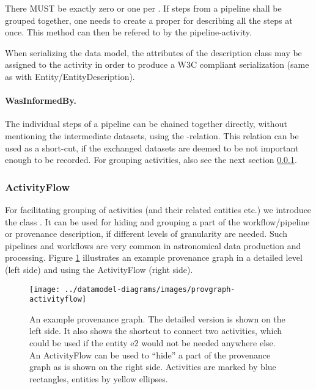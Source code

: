 There MUST be exactly zero or one  per . If steps from a 
pipeline shall be grouped together, one needs to create a proper 
 for describing all the steps at once. This method can then 
be refered to by the pipeline-activity. 

When serializing the data model, the attributes
of the description class may be assigned to the activity in order to produce 
a W3C compliant serialization (same as with Entity/EntityDescription).


\paragraph{WasInformedBy.}
The individual steps of a pipeline can be chained
together directly, without mentioning the intermediate datasets, using the -relation.
This relation can be used as a short-cut, if the exchanged datasets are deemed to be not important
enough to be recorded. For grouping activities, also see the 
next section \ref{sec:activityflow}.


\subsubsection{ActivityFlow}\label{sec:activityflow}
For facilitating grouping of activities (and their related entities etc.)
we introduce the class .
It can be used for hiding and grouping a part of the workflow/pipeline 
or provenance 
description, if different levels of granularity are needed. Such pipelines and workflows are very common in astronomical data production and processing. Figure \ref{fig:provgraph-activityflow}
illustrates an example provenance graph in a detailed level (left side) 
and using the ActivityFlow (right side).


\begin{figure}[h]
\centering
\texttt{[image: ../datamodel-diagrams/images/provgraph-activityflow]}
\caption{An example provenance graph. The detailed version is shown on the left side. It also shows
the shortcut  to connect two activities, which could be used if the entity e2 
would not be needed anywhere else.
An ActivityFlow can be used to ``hide'' a part of the provenance graph as is shown on the right side.
Activities are marked by blue rectangles, entities by yellow ellipses.}
\label{fig:provgraph-activityflow}
\end{figure}

